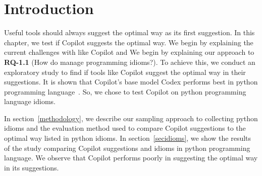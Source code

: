 \label{chapter:methodology}

\section{Introduction}
Useful \cct{} tools should always suggest the optimal way as its first suggestion. In this chapter, we test if Copilot suggests the optimal way. 
We begin by explaining the current challenges with \cct{} like Copilot and 
We begin by explaining our approach to \textbf{RQ-1.1} (How do \cct{} manage programming idioms?). To achieve this, we conduct an exploratory study to find if \cct{} tools like Copilot suggest the optimal way in their suggestions. It is shown that Copilot's base model Codex performs best in python programming language~\cite{copilot}. So, we chose to test Copilot on python programming language idioms.

In section~\ref{methodology}, we describe our sampling approach to collecting python idioms and the evaluation method used to compare Copilot suggestions to the optimal way listed in python idioms. In section~\ref{secidioms}, we show the results of the study comparing Copilot suggestions and idioms in python programming language. We observe that Copilot performs poorly in suggesting the optimal way in its suggestions. 






